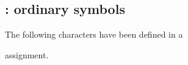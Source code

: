 \vfil\eject

\def\prevclass{}\def\prevfaml{}

\subsection{ : ordinary symbols}

 The following characters have been defined
in a
\begin{disp}
\end{disp}
assignment.
\par\leavevmode\par

